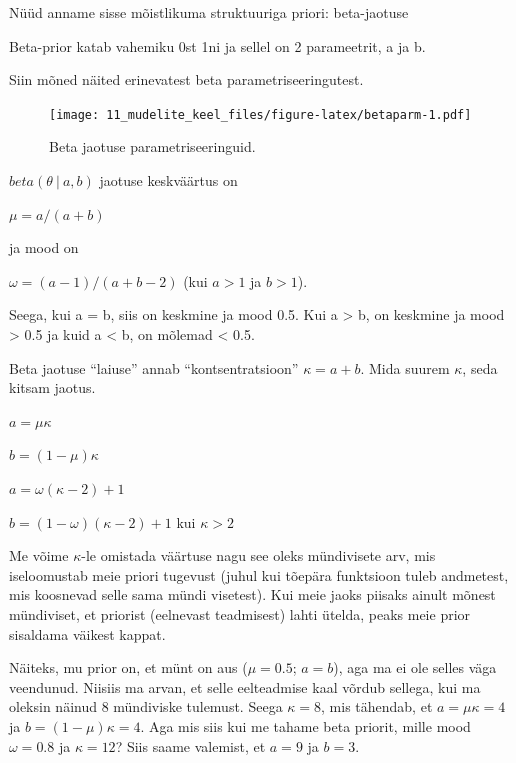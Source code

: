 \documentclass[]{book}
\begin{document}
Nüüd anname sisse mõistlikuma struktuuriga priori: beta-jaotuse

Beta-prior katab vahemiku 0st 1ni ja sellel on 2 parameetrit, a ja b.

Siin mõned näited erinevatest beta parametriseeringutest.



\begin{figure}
\centering
\texttt{[image: 11\_mudelite\_keel\_files/figure-latex/betaparm-1.pdf]}
\caption{\label{fig:betaparm}Beta jaotuse parametriseeringuid.}
\end{figure}

\(beta(\theta~\vert~a,b)\) jaotuse keskväärtus on

\(\mu = a/(a + b)\)

ja mood on

\(\omega= (a-1)/(a + b-2)\) (kui \(a > 1\) ja \(b > 1\)).

Seega, kui a = b, siis on keskmine ja mood 0.5. Kui a \textgreater{} b, on keskmine ja mood \textgreater{} 0.5 ja kuid a \textless{} b, on mõlemad \textless{} 0.5.

Beta jaotuse ``laiuse'' annab ``kontsentratsioon'' \(\kappa = a + b\).
Mida suurem \(\kappa\), seda kitsam jaotus.

\(a = \mu\kappa\)

\(b = (1-\mu)\kappa\)

\(a = \omega(\kappa-2) + 1\)

\(b = (1-\omega)(\kappa-2)+1\) kui \(\kappa > 2\)

Me võime \(\kappa\)-le omistada väärtuse nagu see oleks mündivisete arv, mis iseloomustab meie priori tugevust (juhul kui tõepära funktsioon tuleb andmetest, mis koosnevad selle sama mündi visetest).
Kui meie jaoks piisaks ainult mõnest mündiviset, et priorist (eelnevast teadmisest) lahti ütelda, peaks meie prior sisaldama väikest kappat.

Näiteks, mu prior on, et münt on aus (\(\mu = 0.5\); \(a = b\)), aga ma ei ole selles väga veendunud.
Niisiis ma arvan, et selle eelteadmise kaal võrdub sellega, kui ma oleksin näinud 8 mündiviske tulemust.
Seega \(\kappa = 8\), mis tähendab, et \(a = \mu\kappa = 4\) ja \(b = (1-\mu)\kappa = 4\).
Aga mis siis kui me tahame beta priorit, mille mood \(\omega = 0.8\) ja \(\kappa = 12\)?
Siis saame valemist, et \(a = 9\) ja \(b = 3\).
\end{document}
